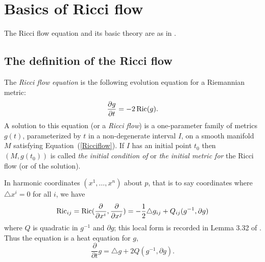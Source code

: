 \chapter{Basics of Ricci flow}
\label{chap:flowbasics}
\label{flowbasics}
The Ricci flow equation and its basic theory are as in
\cite{Hamilton3MPRC,ChowKnopf}.
\section{The definition of the Ricci flow}
\quad
\begin{definition}\label{def:ricci-flow}



The {\em Ricci flow equation} is the
following evolution equation for a Riemannian metric:
\begin{equation}\label{Ricciflow}
\frac{\partial g}{\partial t}= -2\operatorname{Ric}(g). \end{equation} A solution to
this equation (or a {\em Ricci flow}) is a one-parameter
family of metrics $g(t)$, parameterized by $t$ in a non-degenerate interval
$I$, on a smooth manifold $M$ satisfying Equation~(\ref{Ricciflow}). If $I$ has
an initial point $t_0$ then $(M,g(t_0))$ is called  {\sl the initial condition
of} or {\em the initial metric for}  the
Ricci flow (or of the solution).
\end{definition}



In harmonic coordinates $(x^1,\ldots,x^n)$ about $p$,
 that is to say coordinates where $\triangle x^i=0$ for all $i$,
we have
\[ \operatorname{Ric}_{ij}=\operatorname{Ric}(\frac{\partial}{\partial x^i},\frac{\partial}{\partial x^j})=
-\frac{1}{2}\triangle g_{ij} + Q_{ij}(g^{-1},\partial g)\]
where $Q$ is quadratic in $g^{-1}$ and $\partial g$; this local form is
recorded in Lemma 3.32 of \cite{ChowKnopf}. Thus the equation is a heat equation for $g$,
\[ \frac{\partial}{\partial t}g =
\triangle g +2Q(g^{-1},\partial g). \]

